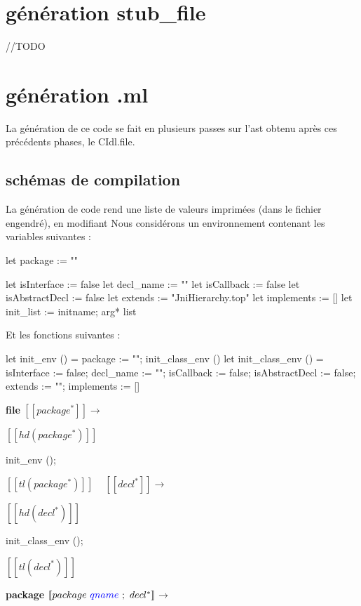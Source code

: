 \documentclass[a4paper, 11pt]{report}
\begin{document}
\section{génération stub\_file}
//TODO











\section{génération .ml}

La génération de ce code se fait en plusieurs passes sur l'ast obtenu
après ces précédents phases, le CIdl.file.

\subsection{schémas de compilation}
La génération de code rend une liste de valeurs imprimées (dans le
fichier engendré), en modifiant
Nous considérons un environnement contenant les  variables suivantes : 
\begin{OCaml}
let package := ""

let isInterface := false
let decl_name := ""
let isCallback := false
let isAbstractDecl := false
let extends := "JniHierarchy.top"
let implements := []
let init_list := {initname; arg*} list
\end{OCaml}
Et les fonctions suivantes :
\begin{OCaml}
let init_env () =
  package := "";
  init_class_env ()
let init_class_env () =
  isInterface := false;
  decl_name := "";
  isCallback := false;
  isAbstractDecl := false;
  extends := "";
  implements := []
\end{OCaml}
\begin{multicols}{2}
\textbf{file}
\newline
\noindent
$[\![ package^* ]\!]$$\longrightarrow$

$[\![ hd(package^*) ]\!]$
\begin{OCaml}
   init_env ();
\end{OCaml} 

$[\![ tl(package^*) ]\!]$ 
\newline
\ 
\newline
\noindent
$[\![ decl^* ]\!]$$\longrightarrow$

$[\![ hd(decl^*) ]\!]$
\begin{OCaml}
   init_class_env ();
\end{OCaml} 

$[\![ tl(decl^*) ]\!]$ 
\newline
\ 
\newline
\end{multicols}
\textbf{package}
\newline
\noindent
$[\![ package\ {\color{blue}qname}\ ;\ decl^* ]\!]$$\longrightarrow$
\end{document}
